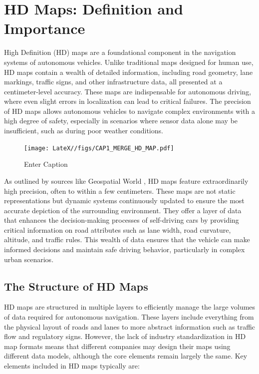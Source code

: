 \section{HD Maps: Definition and Importance}
High Definition (HD) maps are a foundational component in the navigation systems of autonomous vehicles. Unlike traditional maps designed for human use, HD maps contain a wealth of detailed information, including road geometry, lane markings, traffic signs, and other infrastructure data, all presented at a centimeter-level accuracy. These maps are indispensable for autonomous driving, where even slight errors in localization can lead to critical failures. The precision of HD maps allows autonomous vehicles to navigate complex environments with a high degree of safety, especially in scenarios where sensor data alone may be insufficient, such as during poor weather conditions.

\begin{figure}
    \centering
    \texttt{[image: LateX//figs/CAP1\_MERGE\_HD\_MAP.pdf]}
    \caption{Enter Caption}
    \label{fig:enter-label}
\end{figure}

As outlined by sources like Geospatial World \cite{geospatialworld_hd_maps}, HD maps feature extraordinarily high precision, often to within a few centimeters. These maps are not static representations but dynamic systems continuously updated to ensure the most accurate depiction of the surrounding environment. They offer a layer of data that enhances the decision-making processes of self-driving cars by providing critical information on road attributes such as lane width, road curvature, altitude, and traffic rules. This wealth of data ensures that the vehicle can make informed decisions and maintain safe driving behavior, particularly in complex urban scenarios.

\subsection{The Structure of HD Maps}
HD maps are structured in multiple layers to efficiently manage the large volumes of data required for autonomous navigation. These layers include everything from the physical layout of roads and lanes to more abstract information such as traffic flow and regulatory signs. However, the lack of industry standardization in HD map formats means that different companies may design their maps using different data models, although the core elements remain largely the same.
Key elements included in HD maps typically are:

